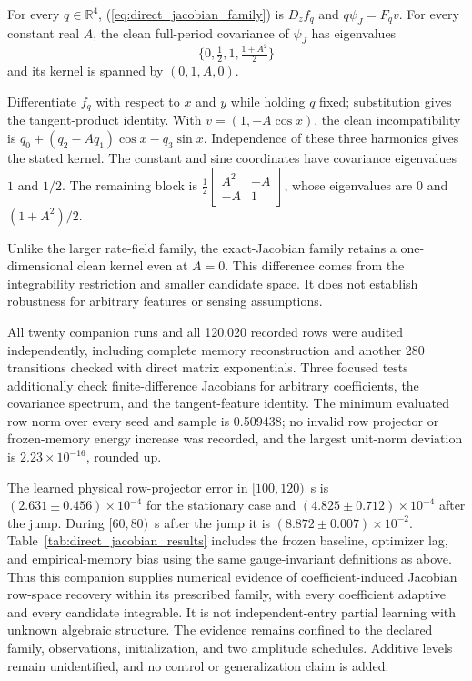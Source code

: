 \begin{directproposition}
\label{prop:direct_jacobian_identifiability}
For every $q\in\mathbb R^4$, (\ref{eq:direct_jacobian_family}) is
$D_zf_q$ and $q\psi_J=F_qv$. For every constant real $A$, the
clean full-period covariance of $\psi_J$ has eigenvalues
\begin{equation}
 \{0,\tfrac12,1,\tfrac{1+A^2}{2}\}
\end{equation}
and its kernel is spanned by $(0,1,A,0)$.
\end{directproposition}
\begin{IEEEproof}
Differentiate $f_q$ with respect to $x$ and $y$ while holding $q$ fixed;
substitution gives the tangent-product identity. With
$v=(1,-A\cos x)$, the clean incompatibility is
$q_0+(q_2-Aq_1)\cos x-q_3\sin x$.
Independence of these three harmonics gives the stated kernel.
The constant and sine coordinates have covariance eigenvalues $1$ and
$1/2$. The remaining block is
$\frac12\left[\begin{smallmatrix}A^2&-A\\-A&1\end{smallmatrix}\right]$,
whose eigenvalues are $0$ and $(1+A^2)/2$.
\end{IEEEproof}
Unlike the larger rate-field family, the exact-Jacobian family retains a
one-dimensional clean kernel even at $A=0$. This difference comes from
the integrability restriction and smaller candidate space. It does not
establish robustness for arbitrary features or sensing assumptions.


All twenty companion runs and all 120,020 recorded rows were audited
independently, including complete memory reconstruction and another
280 transitions checked with direct matrix exponentials. Three focused
tests additionally check finite-difference Jacobians for arbitrary
coefficients, the covariance spectrum, and the tangent-feature identity.
The minimum evaluated row norm over every seed and sample is 0.509438;
no invalid row projector or frozen-memory energy increase was recorded,
and the largest unit-norm deviation is $2.23\times10^{-16}$, rounded up.

The learned physical row-projector error in $[100,120)$~s is
$(2.631\pm0.456)\times10^{-4}$ for the stationary case and
$(4.825\pm0.712)\times10^{-4}$ after the jump. During $[60,80)$~s
after the jump it is $(8.872\pm0.007)\times10^{-2}$.
Table~\ref{tab:direct_jacobian_results} includes the frozen baseline,
optimizer lag, and empirical-memory bias using the same gauge-invariant
definitions as above. Thus this companion supplies numerical evidence of
coefficient-induced Jacobian row-space recovery within its prescribed
family, with every coefficient adaptive and every candidate integrable.
It is not independent-entry partial learning with unknown algebraic structure.
The evidence remains confined to the declared family, observations,
initialization, and two amplitude schedules. Additive levels remain
unidentified, and no control or generalization claim is added.
